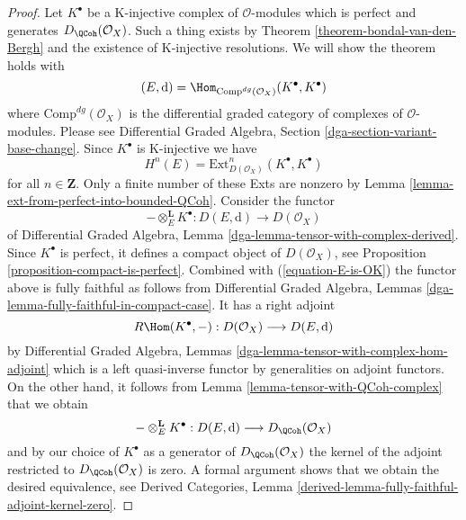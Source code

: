 \begin{proof}
Let $K^\bullet$ be a K-injective complex of $\mathcal{O}$-modules which
is perfect and generates $D_\QCoh(\mathcal{O}_X)$. Such a
thing exists by Theorem \ref{theorem-bondal-van-den-Bergh}
and the existence of K-injective resolutions. We will show the
theorem holds with
$$
(E, \text{d}) = \Hom_{\text{Comp}^{dg}(\mathcal{O}_X)}(K^\bullet, K^\bullet)
$$
where $\text{Comp}^{dg}(\mathcal{O}_X)$ is the differential graded category
of complexes of $\mathcal{O}$-modules. Please see
Differential Graded Algebra, Section \ref{dga-section-variant-base-change}.
Since $K^\bullet$ is K-injective we
have
\begin{equation}
\label{equation-E-is-OK}
H^n(E) = \text{Ext}^n_{D(\mathcal{O}_X)}(K^\bullet, K^\bullet)
\end{equation}
for all $n \in \mathbf{Z}$. Only a finite number of these Exts
are nonzero by Lemma \ref{lemma-ext-from-perfect-into-bounded-QCoh}.
Consider the functor
$$
- \otimes_E^\mathbf{L} K^\bullet :
D(E, \text{d}) \longrightarrow D(\mathcal{O}_X)
$$
of
Differential Graded Algebra, Lemma
\ref{dga-lemma-tensor-with-complex-derived}.
Since $K^\bullet$ is perfect, it defines a compact object of
$D(\mathcal{O}_X)$, see Proposition \ref{proposition-compact-is-perfect}.
Combined with (\ref{equation-E-is-OK}) the functor above is fully
faithful as follows from
Differential Graded Algebra, Lemmas
\ref{dga-lemma-fully-faithful-in-compact-case}. It has a right adjoint
$$
R\Hom(K^\bullet, - ) : D(\mathcal{O}_X) \longrightarrow D(E, \text{d})
$$
by Differential Graded Algebra, Lemmas
\ref{dga-lemma-tensor-with-complex-hom-adjoint}
which is a left quasi-inverse functor by generalities on adjoint
functors. On the other hand, it follows from
Lemma \ref{lemma-tensor-with-QCoh-complex} that we obtain
$$
- \otimes_E^\mathbf{L} K^\bullet :
D(E, \text{d}) \longrightarrow D_\QCoh(\mathcal{O}_X)
$$
and by our choice of $K^\bullet$ as a generator of
$D_\QCoh(\mathcal{O}_X)$ the kernel of the adjoint
restricted to $D_\QCoh(\mathcal{O}_X)$ is zero.
A formal argument shows that we obtain the desired equivalence, see
Derived Categories, Lemma
\ref{derived-lemma-fully-faithful-adjoint-kernel-zero}.
\end{proof}

